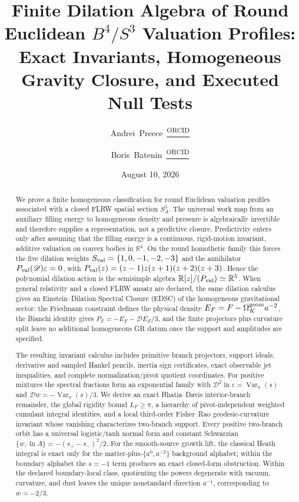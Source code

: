 \documentclass[aps,prd,preprint,onecolumn,nofootinbib,superscriptaddress,showkeys]{revtex4-2}
\providecommand{\orcidlink}[1]{%
  \href{https://orcid.org/#1}{\textsuperscript{\scriptsize ORCID}}%
}
\numberwithin{equation}{section}
\theoremstyle{definition}
\theoremstyle{plain}
\begin{document}
\title{Finite Dilation Algebra of Round Euclidean \texorpdfstring{$B^4/S^3$}{B4/S3} Valuation Profiles: Exact Invariants, Homogeneous Gravity Closure, and Executed Null Tests}

\author{Andrei~Preece\,\orcidlink{0009-0004-5978-795X}}

\author{Boris~Batenin\,\orcidlink{0009-0000-7027-8583}}

\date{August 10, 2026}

\begin{abstract}
We prove a finite homogeneous classification for round Euclidean valuation profiles associated with a closed FLRW spatial section \(S^3_A\).  The universal work map from an auxiliary filling energy to homogeneous density and pressure is algebraically invertible and therefore supplies a representation, not a predictive closure.  Predictivity enters only after assuming that the filling energy is a continuous, rigid-motion invariant, additive valuation on convex bodies in \(\mathbb R^4\).  On the round homothetic family this forces the five dilation weights \(S_{\rm val}=\{1,0,-1,-2,-3\}\) and the annihilator \(P_{\rm val}(\mathscr D)\varepsilon=0\), with \(P_{\rm val}(z)=(z-1)z(z+1)(z+2)(z+3)\).  Hence the polynomial dilation action is the semisimple algebra \(\mathbb R[z]/(P_{\rm val})\simeq\mathbb R^5\).  When general relativity and a closed FLRW ansatz are declared, the same dilation calculus gives an Einstein--Dilation Spectral Closure (EDSC) of the homogeneous gravitational sector: the Friedmann constraint defines the physical density \(E_F=F-\Omega_K^{\rm geom}a^{-2}\), the Bianchi identity gives \(P_F=-E_F-\mathscr D E_F/3\), and the finite projectors plus curvature split leave no additional homogeneous GR datum once the support and amplitudes are specified.

The resulting invariant calculus includes primitive branch projectors, support ideals, derivative and sampled Hankel pencils, inertia sign certificates, exact observable jet inequalities, and complete normalization/pivot quotient coordinates.  For positive mixtures the spectral fractions form an exponential family with \(\mathscr D^2\ln\varepsilon=\operatorname{Var}_\pi(s)\) and \(\mathscr D w=-\operatorname{Var}_\pi(s)/3\).  We derive an exact Bhatia--Davis interior-branch remainder, the global rigidity bound \(L_F\ge\pi\), a hierarchy of pivot-independent weighted cumulant integral identities, and a local third-order Fisher--Rao geodesic-curvature invariant whose vanishing characterizes two-branch support.  Every positive two-branch orbit has a universal logistic/tanh normal form and constant Schwarzian \(\{w,\ln A\}=-(s_+-s_-)^2/2\).  For the smooth-source growth lift, the classical Heath integral is exact only for the matter-plus-\(\{a^0,a^{-2}\}\) background alphabet; within the boundary alphabet the \(s=-1\) term produces an exact closed-form obstruction.  Within the declared boundary-local class, quotienting the powers degenerate with vacuum, curvature, and dust leaves the unique nonstandard direction \(a^{-1}\), corresponding to \(w=-2/3\).


\end{abstract}
\end{document}
